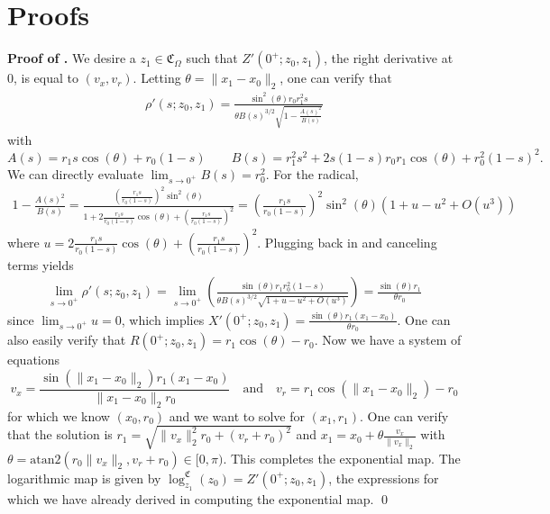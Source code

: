 \documentclass[11pt]{article}
\begin{document}
\section{Proofs} \label{sec: proof of main results}

\noindent \textbf{Proof of .} We desire a $z_1 \in \mathfrak{C}_\Omega$ such that $Z'(0^+; z_0, z_1)$, the right derivative at $0$, is equal to $(v_x, v_r).$ Letting $\theta = \|x_1 - x_0\|_2$, one can verify that 
\begin{align*}
    \rho'(s; z_0, z_1) = \frac{\sin^2(\theta)r_0r_1^2s}{\theta B(s)^{3/2}\sqrt{1 - \frac{A(s)^2}{B(s)}}}
\end{align*}
with 
\begin{equation*}
    A(s) = r_1s\cos(\theta) + r_0(1-s) \qquad B(s) = r_1^2s^2 + 2s(1-s)r_0r_1\cos(\theta) + r_0^2(1-s)^2.
\end{equation*}
We can directly evaluate $\lim_{s \rightarrow 0^+}B(s) = r_0^2$. For the radical,
\begin{align*}
    1 - \frac{A(s)^2}{B(s)} = \frac{\left(\frac{r_1s}{r_0(1-s)}\right)^2\sin^2(\theta)}{1 + 2\frac{r_1s}{r_0(1-s)}\cos(\theta) + \left(\frac{r_1s}{r_0(1-s)}\right)^2} = \left(\frac{r_1s}{r_0(1-s)}\right)^2\sin^2(\theta)\left(1 + u - u^2 + O(u^3)\right)
\end{align*}
where $u = 2\frac{r_1s}{r_0(1-s)}\cos(\theta) + \left(\frac{r_1s}{r_0(1-s)}\right)^2$. Plugging back in and canceling terms yields
\begin{align*}
    \lim_{s \rightarrow 0^+}\rho'(s; z_0, z_1) = \lim_{s\rightarrow 0^+}\left(\frac{\sin(\theta)r_1r_0^2(1-s)}{\theta B(s)^{3/2}\sqrt{1  + u - u^2 + O(u^3)}}\right) = \frac{\sin(\theta)r_1}{\theta r_0}
\end{align*}
since $\lim_{s \rightarrow 0^+}u = 0$, which implies $X'(0^+; z_0, z_1) = \frac{\sin(\theta)r_1(x_1 - x_0)}{\theta r_0}$. One can also easily verify that $R(0^+; z_0, z_1) = r_1\cos(\theta) - r_0$. Now we have a system of equations 
\begin{equation*}
    v_x = \frac{\sin(\|x_1 - x_0\|_2)r_1(x_1 - x_0)}{\|x_1 - x_0\|_2 r_0} \quad \text{and} \quad  v_r = r_1\cos(\|x_1 - x_0\|_2) - r_0
\end{equation*}
for which we know $(x_0, r_0)$ and we want to solve for $(x_1, r_1)$. One can verify that the solution is $r_1 = \sqrt{\|v_x\|_2^2r_0 + (v_r+r_0)^2}$ and $x_1 = x_0 + \theta\frac{v_x}{\|v_x\|_2}$ with $\theta = \text{atan2}(r_0\|v_x\|_2, v_r + r_0) \in [0, \pi)$. This completes the exponential map. The logarithmic map is given by
$\log^{\mathfrak{C}}_{z_1}(z_0) = Z'(0^+; z_0, z_1)$, the expressions for which we have already derived in computing the exponential map.
\qed{}
\\
\end{document}

